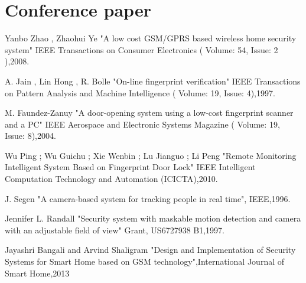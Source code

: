 \documentclass[twoside,a4paper,16pt]{book}
\begin{document}
{{\section{Conference paper}
\begin{enumerate}[label={[\arabic*]}]
	\setcounter{enumi}{15}
	\item Yanbo Zhao ,  Zhaohui Ye "A low cost GSM/GPRS based wireless home security system" IEEE Transactions on Consumer Electronics ( Volume: 54, Issue: 2 ),2008.\\
	\item 	A. Jain , Lin Hong , R. Bolle "On-line fingerprint verification" IEEE Transactions on Pattern Analysis and Machine Intelligence ( Volume: 19, Issue: 4),1997.\\
	\item 	M. Faundez-Zanuy "A door-opening system using a low-cost fingerprint scanner and a PC" IEEE Aerospace and Electronic Systems Magazine ( Volume: 19, Issue: 8),2004.\\
	\item Wu Ping ;  Wu Guichu ;  Xie Wenbin ;  Lu Jianguo ;  Li Peng "Remote Monitoring Intelligent System Based on Fingerprint Door Lock" IEEE Intelligent Computation Technology and Automation (ICICTA),2010.\\
	\item J. Segen "A camera-based system for tracking people in real time", IEEE,1996.\\
	\item Jennifer L. Randall "Security system with maskable motion detection and camera with an adjustable field of view" Grant, US6727938 B1,1997.\\
	\item Jayashri Bangali and Arvind Shaligram "Design and Implementation of Security Systems for Smart Home based on GSM technology",International Journal of Smart Home,2013\\
\end{enumerate}

}}
\end{document}
